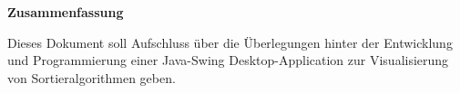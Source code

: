 \begin{center}
\textbf{\large Zusammenfassung}
\end{center}

Dieses Dokument soll Aufschluss über die Überlegungen hinter
der Entwicklung und Programmierung einer Java-Swing Desktop-Application 
zur Visualisierung von Sortieralgorithmen geben.

\vspace{1cm}
